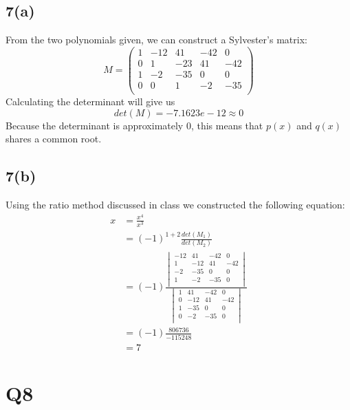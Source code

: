 \documentclass{article}
\begin{document}
\subsection*{7(a)}
From the two polynomials given, we can construct a Sylvester's matrix:
\begin{equation*}
M = 
\begin{pmatrix}
1 &-12 &41 &-42& 0\\
0 &1   &-23 & 41 & -42\\
1& -2& -35& 0& 0\\
0& 0& 1& -2& -35\\ 
\end{pmatrix}
\end{equation*}
Calculating the determinant will give us
\begin{equation*}
det(M) = -7.1623e-12 \approx 0
\end{equation*}
Because the determinant is approximately 0, this means that $p(x)$ and $q(x)$ shares a common root.
\subsection{7(b)}
Using the ratio method discussed in class we constructed the following equation:
\begin{equation*}
\begin{aligned}
x &= \frac{x^4}{x^3} \\
&=(-1)^{1+2}\frac{det(M_1)}{det(M_2)} \\
&=(-1)\frac{
	\begin{vmatrix}
	-12 & 41 &-42 &  0\\
	  1 &-12 & 41 &-42\\
	 -2 &-35 &  0 &  0\\
	  1 & -2 &-35 &  0\\
	\end{vmatrix}
}{
	\begin{vmatrix}
	  1 & 41 &-42 &  0\\
	  0 &-12 & 41 &-42\\
	  1 &-35 &  0 &  0\\
	  0 & -2 &-35 &  0\\	
	\end{vmatrix}
}\\
&=(-1)\frac{806736}{-115248}\\
&=7
\end{aligned}
\end{equation*}
\section{Q8}
\end{document}
